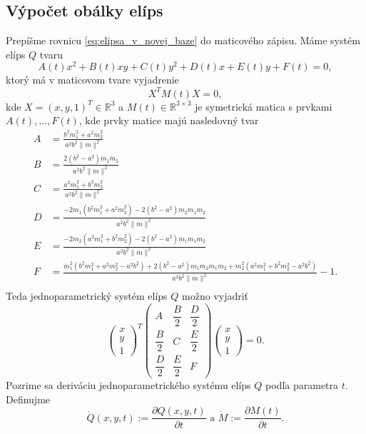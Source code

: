 \subsection{Výpočet obálky elíps}
Prepíšme rovnicu \ref{eq:elipsa_v_novej_baze} do maticového zápisu. Máme systém elíps $Q$ tvaru $$
A(t)x^2 + B(t)xy + C(t)y^2 + D(t)x + E(t)y + F(t) = 0,$$
ktorý má v maticovom tvare vyjadrenie $$
X^TM(t)X = 0,
$$ kde $X=(x, y, 1)^T \in \mathbb{R}^3$ a $M(t) \in  \mathbb{R}^{3 \times 3}$ je symetrická matica s prvkami $A(t), \dots, F(t) $, kde prvky matice majú nasledovný tvar
\begin{align*}
A &= \frac{b^2 \dot{m}_1^2 + a^2 \dot{m}_2^2}{a^2b^2 \| \dot{m} \|^2} \\
B &= \frac{2(b^2-a^2)\dot{m}_1 \dot{m}_2}{a^2b^2 \| \dot{m} \|^2} \\
C &= \frac{a^2 \dot{m}_1^2 + b^2 \dot{m}_2^2}{a^2b^2\| \dot{m} \|^2} \\
D &= \frac{- 2m_1 \left( b^2 \dot{m}_1^2 + a^2 \dot{m}_2^2 \right) - 2 \left(b^2 - a^2 \right) m_2 \dot{m}_1 \dot{m}_2 }{a^2b^2\| \dot{m} \|^2} \\
E &= \frac{- 2m_2 \left( a^2 \dot{m}_1^2 + b^2 \dot{m}_2^2 \right) - 2 \left(b^2 - a^2 \right) m_1 \dot{m}_1 \dot{m}_2 }{a^2b^2\| \dot{m} \|^2} \\
F &= \frac{\dot{m}_1^2 (b^2 m_1^2 + a^2 m_2^2 - a^2b^2) + 2 (b^2 - a^2) m_1 m_2 \dot{m}_1 \dot{m}_2 + \dot{m}_2^2 (a^2 m_1^2 + b^2 m_2^2 - a^2b^2) }{a^2b^2\| \dot{m}  \|^2}  -  1.  \\
\end{align*}
Teda jednoparametrický systém elíps $Q$ možno vyjadriť 
$$
\left(\begin{matrix} x \\ y \\ 1 
\end{matrix} \right)^T \left(\begin{matrix} 
A & \dfrac{B}{2} & \dfrac{D}{2} \\
\dfrac{B}{2} & C & \dfrac{E}{2} \\
\dfrac{D}{2} & \dfrac{E}{2} & F 
\end{matrix} \right)\left(\begin{matrix} x \\ y \\ 1 
\end{matrix} \right) = 0.
$$
Pozrime sa deriváciu jednoparametrického systému elíps $Q$ podľa parametra $t.$ Definujme
$$ 
\dot{Q}(x,y,t) := \frac{\partial Q (x,y,t)}{\partial t} \text{ a } \dot{M} :=\frac{\partial M(t)}{\partial t}.
$$

